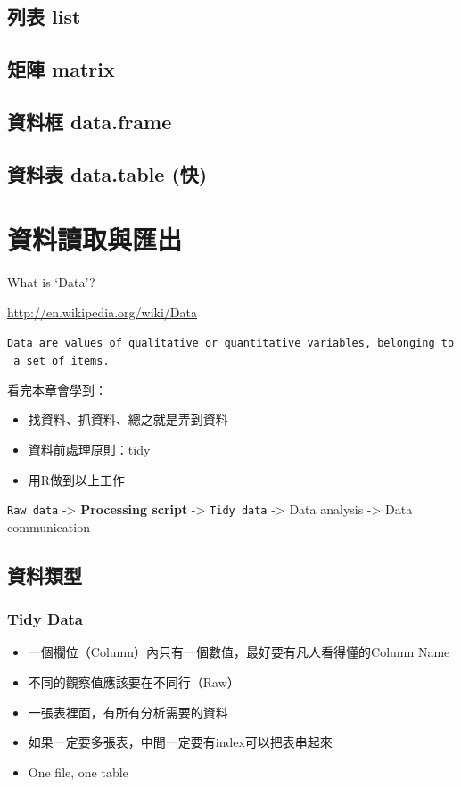\documentclass[]{book}
\providecommand{\tightlist}{%
  \setlength{\itemsep}{0pt}\setlength{\parskip}{0pt}}
\theoremstyle{definition}
\theoremstyle{definition}
\theoremstyle{remark}
\begin{document}
\section{列表 list}\label{-list}

\section{矩陣 matrix}\label{-matrix}

\section{資料框 data.frame}\label{-data.frame}

\section{資料表 data.table (快)}\label{-data.table-}

\chapter{資料讀取與匯出}\label{io}

What is `Data'?

\url{http://en.wikipedia.org/wiki/Data}

\texttt{Data\ are\ values\ of\ qualitative\ or\ quantitative\ variables,\ belonging\ to\ a\ set\ of\ items.}

看完本章會學到：

\begin{itemize}
\tightlist
\item
  找資料、抓資料、總之就是弄到資料
\item
  資料前處理原則：tidy
\item
  用R做到以上工作
\end{itemize}

\texttt{Raw\ data} -\textgreater{} \textbf{Processing script}
-\textgreater{} \texttt{Tidy\ data} -\textgreater{} Data analysis
-\textgreater{} Data communication

\section{資料類型}

\subsection{Tidy Data}\label{tidy-data}

\begin{itemize}
\tightlist
\item
  一個欄位（Column）內只有一個數值，最好要有凡人看得懂的Column Name
\item
  不同的觀察值應該要在不同行（Raw）
\item
  一張表裡面，有所有分析需要的資料
\item
  如果一定要多張表，中間一定要有index可以把表串起來
\item
  One file, one table
\end{itemize}
\end{document}
